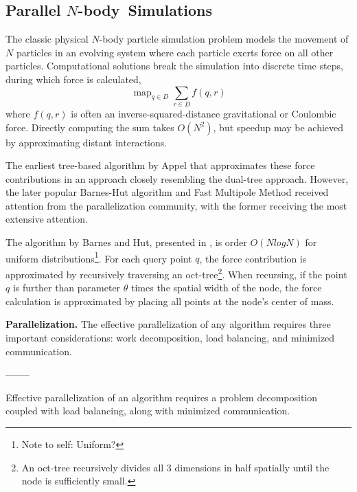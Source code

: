 \documentclass[times, leqno,twocolumn]{article}
\newcommand{\authornote}[1]{\footnote{Note to self: #1}}
\DeclareMathOperator*{\map}{map}
\newcommand{\nbody}{$N$-body}
\begin{document}
\subsection{Parallel \nbody\ Simulations}

The classic physical $N$-body particle simulation problem models the movement of $N$ particles in an evolving system where each particle exerts force on all other particles.
Computational solutions break the simulation into discrete time steps, during which force is calculated,
\[\map_{q \in D} \sum_{r \in D} f(q,r)\]
\noindent where $f(q,r)$ is often an inverse-squared-distance gravitational or Coulombic force.
Directly computing the sum takes $O(N^2)$, but speedup may be achieved by approximating distant interactions.

The earliest tree-based algorithm by Appel \cite{appel} that approximates these force contributions in an approach closely resembling the dual-tree approach.
However, the later popular Barnes-Hut algorithm\cite{barneshut} and Fast Multipole Method\cite{greengard_fmm} received attention from the parallelization community, with the former receiving the most extensive attention.

The algorithm by Barnes and Hut, presented in \cite{barneshut}, is order $O(N log N)$ for uniform distributions\authornote{Uniform?}.
For each query point $q$, the force contribution is approximated by recursively traversing an oct-tree\footnote{An oct-tree recursively divides all 3 dimensions in half spatially until the node is sufficiently small.}.
When recursing, if the point $q$ is further than parameter $\theta$ times the spatial width of the node, the force calculation is approximated by placing all points at the node's center of mass.

{\bf Parallelization.}
The effective parallelization of any algorithm requires three important considerations: work decomposition, load balancing, and minimized communication.



--------

Effective parallelization of an algorithm requires a problem decomposition coupled with load balancing, along with minimized communication.
\end{document}
